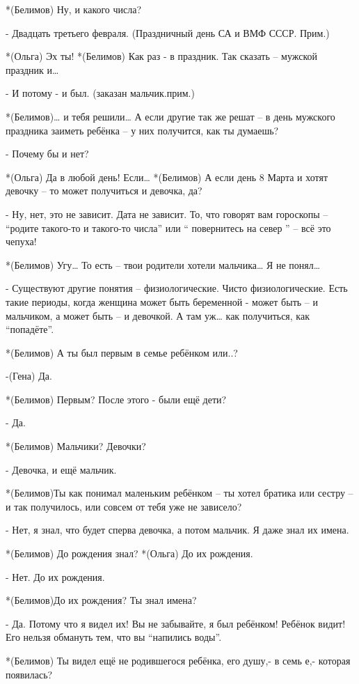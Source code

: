 *(Белимов) Ну, и какого числа?

- Двадцать третьего февраля. (Праздничный день СА и ВМФ СССР. Прим.)

*(Ольга) Эх ты!
*(Белимов) Как раз - в праздник. Так сказать – мужской праздник и…

- И потому - и был. (заказан мальчик.прим.)

*(Белимов)… и тебя решили… А если другие так же решат – в день мужского праздника заиметь ребёнка – у них получится, как ты думаешь?

- Почему бы и нет?

*(Ольга) Да в любой день! Если…
*(Белимов) А если день 8 Марта и хотят девочку – то может получиться и девочка, да?

- Ну, нет, это не зависит. Дата не зависит. То, что говорят вам гороскопы – “родите такого-то и такого-то числа” или “ повернитесь на север ” – всё это чепуха!

*(Белимов) Угу… То есть – твои родители хотели мальчика… Я не понял…

- Существуют другие понятия – физиологические. Чисто физиологические. Есть такие периоды, когда женщина может быть беременной  - может быть – и мальчиком, а может быть – и девочкой. А там уж… как получиться, как “попадёте”.

*(Белимов) А ты был первым  в семье ребёнком или..?

-(Гена) Да.

*(Белимов) Первым? После этого - были ещё дети?

- Да.

*(Белимов) Мальчики? Девочки?

- Девочка, и ещё мальчик.

*(Белимов)Ты как понимал маленьким ребёнком – ты хотел братика или сестру – и так получилось, или совсем от тебя уже не зависело?


- Нет, я знал, что будет сперва девочка, а потом мальчик. Я даже знал их имена.

*(Белимов) До рождения знал?
*(Ольга) До их рождения.

- Нет. До их рождения.

*(Белимов)До их рождения? Ты знал имена?

- Да. Потому что я видел их!  Вы не забывайте, я был ребёнком! Ребёнок видит! Его нельзя обмануть тем, что вы “напились воды”.

*(Белимов) Ты видел ещё не родившегося ребёнка, его душу,- в семь е,- которая появилась?

